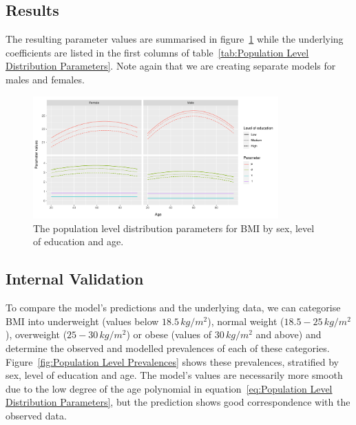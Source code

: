 \documentclass{imammb}
\numberwithin{equation}{section}
\begin{document}
\subsection{Results}
\label{sec:Population Level Distribution/Results}

The resulting parameter values are summarised in figure~\ref{fig:Population Level Distribution Parameters} while the underlying coefficients are listed in the first columns of table~\ref{tab:Population Level Distribution Parameters}. Note again that we are creating separate models for males and females.

\vspace{-5mm}

\begin{figure}[!h]
\centering
\includegraphics[width=0.84\textwidth] {"Figures/Population Level Distribution Parameters.pdf"}
\caption{The population level distribution parameters for BMI by sex, level of education and age.}
\label{fig:Population Level Distribution Parameters}
\vspace*{-9pt}
\end{figure}

\subsection{Internal Validation}
\label{sec:Population Level Distribution/Internal Validation}

To compare the model's predictions and the underlying data, we can categorise BMI into underweight (values below $18.5 \, kg / m^2$), normal weight ($18.5 - 25 \, kg / m^2$), overweight ($25 - 30 \, kg / m^2$) or obese (values of $30 \, kg / m^2$ and above) and determine the observed and modelled prevalences of each of these categories. Figure~\ref{fig:Population Level Prevalences} shows these prevalences, stratified by sex, level of education and age. The model's values are necessarily more smooth due to the low degree of the age polynomial in equation~\ref{eq:Population Level Distribution Parameters}, but the prediction shows good correspondence with the observed data.
\end{document}
